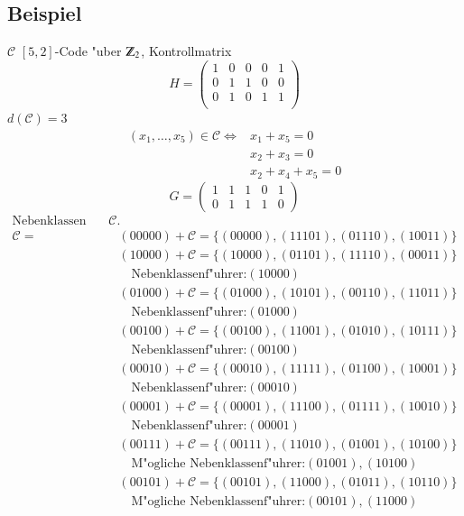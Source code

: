 \subsection{Beispiel}
$\mathcal{C}$ $[5,2]$-Code "uber $\Z_2$, Kontrollmatrix
\[
	H=
	\begin{pmatrix}
		1 & 0 & 0 & 0 & 1\\
		0 & 1 & 1 & 0 & 0\\
		0 & 1 & 0 & 1 & 1\\
	\end{pmatrix}
\]
$d(\mathcal{C})=3$
\begin{align*}
(x_1,\ldots,x_5) \in \mathcal{C} \Leftrightarrow &x_1+x_5 = 0\\
& x_2+x_3=0\\
&x_2+x_4+x_5=0
\end{align*}
\[
	G=
	\begin{pmatrix}
		1 & 1 & 1 & 0 & 1\\
		0 & 1 & 1 & 1 &0
	\end{pmatrix}
\]
\begin{align*}
\text{Nebenklassen von } \mathcal{C}.\\
\mathcal{C} = &(00000) + \mathcal{C} = \lbrace (00000),(11101),(01110),(10011) \rbrace\\
					  &(10000) + \mathcal{C} = \lbrace (10000),(01101),(11110),(00011) \rbrace\\
					  &\quad \text{Nebenklassenf"uhrer:} (10000)\\
					  &(01000) + \mathcal{C} = \lbrace (01000),(10101),(00110),(11011) \rbrace\\
					  &\quad \text{Nebenklassenf"uhrer:} (01000)\\
					  &(00100) + \mathcal{C} = \lbrace (00100),(11001),(01010),(10111) \rbrace\\
					  &\quad \text{Nebenklassenf"uhrer:} (00100)\\
					  &(00010) + \mathcal{C} = \lbrace (00010),(11111),(01100),(10001) \rbrace\\
					  &\quad \text{Nebenklassenf"uhrer:} (00010)\\
					  &(00001) + \mathcal{C} = \lbrace (00001),(11100),(01111),(10010) \rbrace\\
					  &\quad \text{Nebenklassenf"uhrer:} (00001)\\
					  &(00111) + \mathcal{C} = \lbrace (00111),(11010),(01001),(10100) \rbrace\\
					  &\quad \text{M"ogliche Nebenklassenf"uhrer:} (01001), (10100)\\
					  &(00101) + \mathcal{C} = \lbrace (00101),(11000),(01011),(10110) \rbrace\\
					  &\quad \text{M"ogliche Nebenklassenf"uhrer:} (00101), (11000)\\
\end{align*}
